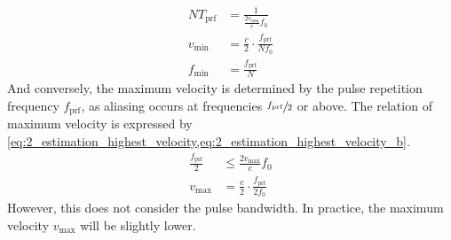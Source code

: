 \begin{subequations}
	\begin{align}
		N T_{\mathrm{prf}} &= \frac{1}{\frac{2v_{\mathrm{min}}}{c}f_{0}} \label{eq:2_estimation_lowest_velocity} \\
		v_{\mathrm{min}} &= \frac{c}{2}\cdot\frac{f_{\mathrm{prf}}}{N f_{0}} \label{eq:2_estimation_lowest_velocity_b} \\
		f_{\mathrm{min}} &= \frac{f_{\mathrm{prf}}}{N} \label{eq:2_estimation_lowest_frequency}
	\end{align}
\end{subequations}
And conversely, the maximum velocity is determined by the pulse repetition frequency $f_{\mathrm{prf}}$, as aliasing occurs at frequencies $\sfrac{f_{\mathrm{prf}}}{2}$ or above. The relation of maximum velocity is expressed by \cref{eq:2_estimation_highest_velocity,eq:2_estimation_highest_velocity_b}.
\begin{subequations}
	\begin{align}
		\frac{f_{\mathrm{prf}}}{2} &\le \frac{2v_{\mathrm{max}}}{c}f_{0} \label{eq:2_estimation_highest_velocity} \\
		v_{\mathrm{max}} &= \frac{c}{2}\cdot \frac{f_{\mathrm{prf}}}{2f_{0}} \label{eq:2_estimation_highest_velocity_b}
	\end{align}
\end{subequations}
However, this does not consider the pulse bandwidth. In practice, the maximum velocity $v_{\mathrm{max}}$ will be slightly lower.
